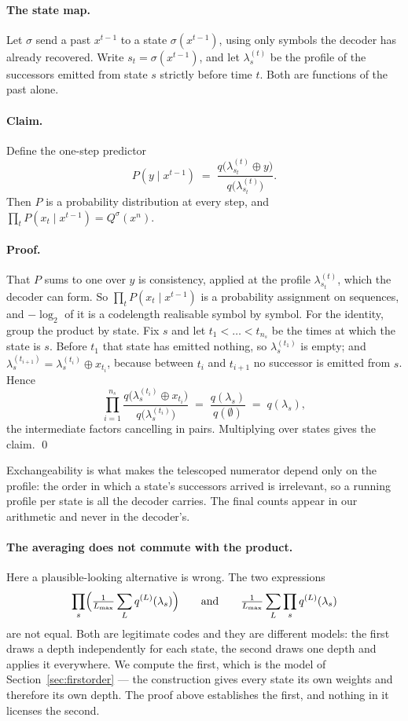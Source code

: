 \documentclass[11pt]{article}
\begin{document}
\paragraph{The state map.}  Let $\sigma$ send a past $x^{t-1}$ to a
state $\sigma(x^{t-1})$, using only symbols the decoder has already
recovered.  Write $s_t = \sigma(x^{t-1})$, and let $\lambda_s^{(t)}$ be
the profile of the successors emitted from state $s$ strictly before
time $t$.  Both are functions of the past alone.

\paragraph{Claim.}  Define the one-step predictor
\[
  P(y \mid x^{t-1}) \;=\;
  \frac{q\bigl(\lambda^{(t)}_{s_t} \oplus y\bigr)}
       {q\bigl(\lambda^{(t)}_{s_t}\bigr)} .
\]
Then $P$ is a probability distribution at every step, and
$\prod_{t} P(x_t \mid x^{t-1}) = Q^{\sigma}(x^n)$.

\paragraph{Proof.}  That $P$ sums to one over $y$ is consistency, applied
at the profile $\lambda^{(t)}_{s_t}$, which the decoder can form.  So
$\prod_t P(x_t \mid x^{t-1})$ is a probability assignment on sequences,
and $-\log_2$ of it is a codelength realisable symbol by symbol.  For
the identity, group the product by state.  Fix $s$ and let
$t_1 < \dots < t_{n_s}$ be the times at which the state is $s$.  Before
$t_1$ that state has emitted nothing, so $\lambda^{(t_1)}_s$ is empty;
and $\lambda^{(t_{i+1})}_s = \lambda^{(t_i)}_s \oplus x_{t_i}$, because
between $t_i$ and $t_{i+1}$ no successor is emitted from $s$.  Hence
\[
  \prod_{i=1}^{n_s}
  \frac{q\bigl(\lambda^{(t_i)}_s \oplus x_{t_i}\bigr)}
       {q\bigl(\lambda^{(t_i)}_s\bigr)}
  \;=\; \frac{q(\lambda_s)}{q(\emptyset)} \;=\; q(\lambda_s),
\]
the intermediate factors cancelling in pairs.  Multiplying over states
gives the claim. \qed

Exchangeability is what makes the telescoped numerator depend only on
the profile: the order in which a state's successors arrived is
irrelevant, so a running profile per state is all the decoder carries.
The final counts appear in our arithmetic and never in the decoder's.

\paragraph{The averaging does not commute with the product.}  Here a
plausible-looking alternative is wrong.  The two expressions
\[
  \prod_s \Bigl( \tfrac{1}{L_{\max}} \sum_L q^{(L)}(\lambda_s) \Bigr)
  \qquad\text{and}\qquad
  \tfrac{1}{L_{\max}} \sum_L \prod_s q^{(L)}(\lambda_s)
\]
are not equal.  Both are legitimate codes and they are different models:
the first draws a depth independently for each state, the second draws
one depth and applies it everywhere.  We compute the first, which is the
model of Section~\ref{sec:firstorder} --- the construction gives every
state its own weights and therefore its own depth.  The proof above
establishes the first, and nothing in it licenses the second.
\end{document}
